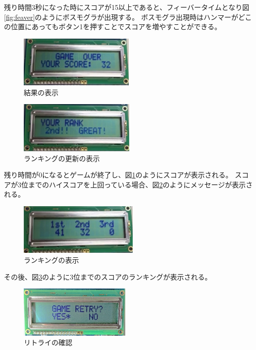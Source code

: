 \documentclass[11pt,a4j]{jsarticle}
\makeatletter
\newcommand{\figcaption}[1]{\def\@captype{figure}\caption{#1}}
\makeatother
\begin{document}
残り時間3秒になった時にスコアが15以上であると、フィーバータイムとなり図\ref{fig:feaver}のようにボスモグラが出現する。
ボスモグラ出現時はハンマーがどこの位置にあってもボタン1を押すことでスコアを増やすことができる。

\begin{figure}[H]
  \centering
  \includegraphics[height=25mm,bb=0 0 766 342]{img/result.png}
  \figcaption{結果の表示}
  \label{fig:result}
\end{figure}

\begin{figure}[H]
  \centering
  \includegraphics[height=25mm,bb=0 0 755 335]{img/update.png}
  \figcaption{ランキングの更新の表示}
  \label{fig:update}
\end{figure}

残り時間が0になるとゲームが終了し、図\ref{fig:result}のようにスコアが表示される。
スコアが3位までのハイスコアを上回っている場合、図\ref{fig:update}のようにメッセージが表示される。

\begin{figure}[H]
  \centering
  \includegraphics[height=25mm,bb=0 0 762 327]{img/ranking.png}
  \figcaption{ランキングの表示}
  \label{fig:ranking}
\end{figure}

その後、図\ref{fig:ranking}のように3位までのスコアのランキングが表示される。


\begin{figure}[H]
  \centering
  \includegraphics[height=25mm,bb=0 0 762 352]{img/retry.png}
  \figcaption{リトライの確認}
  \label{fig:retry}
\end{figure}
\end{document}

